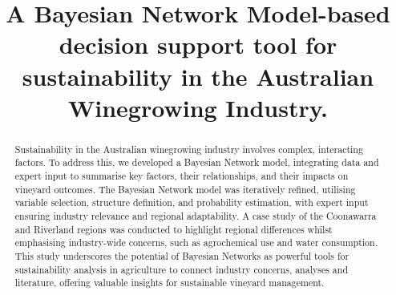 \documentclass[10pt,letterpaper]{article}
\title{A Bayesian Network Model-based decision support tool for sustainability in the Australian Winegrowing Industry.}
\begin{document}




\begin{abstract}
Sustainability in the Australian winegrowing industry involves complex, interacting factors. To address this, we developed a Bayesian Network model, integrating data and expert input to summarise key factors, their relationships, and their impacts on vineyard outcomes. The Bayesian Network model was iteratively refined, utilising variable selection, structure definition, and probability estimation, with expert input ensuring industry relevance and regional adaptability. A case study of the Coonawarra and Riverland regions was conducted to highlight regional differences whilst emphasising industry-wide concerns, such as agrochemical use and water consumption. This study underscores the potential of Bayesian Networks as powerful tools for sustainability analysis in agriculture to connect industry concerns, analyses and literature, offering valuable insights for sustainable vineyard management.
\end{abstract}


\flushbottom
\maketitle

\thispagestyle{empty}
\end{document}
